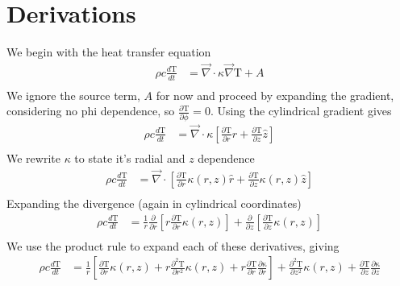 \documentclass[12pt]{article}
\begin{document}
		\section{Derivations}
		We begin with the heat transfer equation
		\begin{equation}
		\begin{aligned}
		\rho c \frac{d\mathrm{T}}{dt} &= \vec\nabla \cdot \kappa \vec\nabla \mathrm{T} + A \\
		\end{aligned}
		\end{equation}
		We ignore the source term, $A$ for now and proceed by expanding the gradient, considering no phi dependence, so $\frac{\partial\mathrm{T}}{\partial\phi}=0$. Using the cylindrical gradient gives
		\begin{equation}
		\begin{aligned}
		\rho c \frac{d\mathrm{T}}{dt} &= \vec\nabla \cdot \kappa \left [  \frac{\partial\mathrm{T}}{\partial r}\hat r  + \frac{\partial\mathrm{T}}{\partial z}\hat z \right ] \\
		\end{aligned}
		\end{equation}
		We rewrite $\kappa$ to state it's radial and $z$ dependence
		\begin{equation}
		\begin{aligned}
		\rho c \frac{d\mathrm{T}}{dt} &= \vec\nabla \cdot \left [  \frac{\partial\mathrm{T}}{\partial r}\kappa(r, z) \hat r  + \frac{\partial\mathrm{T}}{\partial z}\kappa(r, z) \hat z \right ] \\
		\end{aligned}
		\end{equation}
		Expanding the divergence (again in cylindrical coordinates)
		\begin{equation}
		\begin{aligned}
		\rho c \frac{d\mathrm{T}}{dt} &= \frac{1}{r}\frac{\partial}{\partial r}  \left [ r \frac{\partial\mathrm{T}}{\partial r}\kappa(r, z) \right ]  + \frac{\partial}{\partial z} \left [ \frac{\partial\mathrm{T}}{\partial z}\kappa(r, z)  \right ] \\
		\end{aligned}
		\end{equation}
		We use the product rule to expand each of these derivatives, giving
		\begin{equation}
		\begin{aligned}
		\rho c \frac{d\mathrm{T}}{dt} &= \frac{1}{r} \left [ \frac{\partial\mathrm{T}}{\partial r}\kappa(r, z) + r\frac{\partial^2\mathrm{T}}{\partial r^2}\kappa(r, z)  + r\frac{\partial\mathrm{T}}{\partial r} \frac{\partial\mathrm{\kappa}}{\partial r} \right ] + \frac{\partial^2\mathrm{T}}{\partial z^2}\kappa(r, z) + \frac{\partial\mathrm{T}}{\partial z}\frac{\partial\mathrm{\kappa}}{\partial z} \\
		\end{aligned}
		\end{equation}
\end{document}
